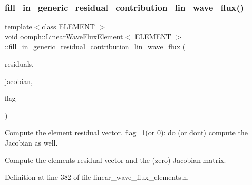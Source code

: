 \mbox{\label{classoomph_1_1LinearWaveFluxElement_abde1eec8fa1a4c1ff97c1cd33fe1c727}} 
\subsubsection{\texorpdfstring{fill\+\_\+in\+\_\+generic\+\_\+residual\+\_\+contribution\+\_\+lin\+\_\+wave\+\_\+flux()}{fill\_in\_generic\_residual\_contribution\_lin\_wave\_flux()}}
{\footnotesize\ttfamily template$<$class E\+L\+E\+M\+E\+NT $>$ \\
void \hyperlink{classoomph_1_1LinearWaveFluxElement}{oomph\+::\+Linear\+Wave\+Flux\+Element}$<$ E\+L\+E\+M\+E\+NT $>$\+::fill\+\_\+in\+\_\+generic\+\_\+residual\+\_\+contribution\+\_\+lin\+\_\+wave\+\_\+flux (\begin{DoxyParamCaption}\item[{\hyperlink{classoomph_1_1Vector}{Vector}$<$ double $>$ \&}]{residuals,  }\item[{\hyperlink{classoomph_1_1DenseMatrix}{Dense\+Matrix}$<$ double $>$ \&}]{jacobian,  }\item[{unsigned}]{flag }\end{DoxyParamCaption})\hspace{0.3cm}{\ttfamily [private]}}



Compute the element residual vector. flag=1(or 0)\+: do (or don\textquotesingle{}t) compute the Jacobian as well. 

Compute the element\textquotesingle{}s residual vector and the (zero) Jacobian matrix. 

Definition at line 382 of file linear\+\_\+wave\+\_\+flux\+\_\+elements.\+h.




